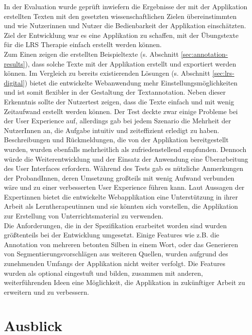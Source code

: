 In der Evaluation wurde geprüft inwiefern die Ergebnisse der mit der Applikation erstellten Texten mit den gesetzten wissenschaftlichen Zielen übereinstimmten und wie Nutzerinnen und Nutzer die Bedienbarkeit der Applikation einschätzten. Ziel der Entwicklung war es eine Applikation zu schaffen, mit der Übungstexte für die LRS Therapie einfach erstellt werden können.\\
Zum Einen zeigen die erstellten Beispieltexte (s. Abschnitt \ref{sec:annotation-results}), dass solche Texte mit der Applikation erstellt und exportiert werden können. Im Vergleich zu bereits existierenden Lösungen (s. Abschnitt \ref{sec:lrs-digital}) bietet die entwickelte Webanwendung mehr Einstellungsmöglichkeiten und ist somit flexibler in der Gestaltung der Textannotation. Neben dieser Erkenntnis sollte der Nutzertest zeigen, dass die Texte einfach und mit wenig Zeitaufwand erstellt werden können. Der Test deckte zwar einige Probleme bei der User Experience auf, allerdings gab bei jedem Szenario die Mehrheit der NutzerInnen an, die Aufgabe intuitiv und zeiteffizient erledigt zu haben. Beschreibungen und Rückmeldungen, die von der Applikation bereitgestellt wurden, wurden ebenfalls mehrheitlich als zufriedenstellend empfunden. Dennoch würde die Weiterentwicklung und der Einsatz der Anwendung eine Überarbeitung des User Interfaces erfordern. Während des Tests gab es nützliche Anmerkungen der ProbandInnen, deren Umsetzung großteils mit wenig Aufwand verbunden wäre und zu einer verbesserten User Experience führen kann. Laut Aussagen der Expertinnen bietet die entwickelte Webapplikation eine Unterstützung in ihrer Arbeit als Lerntherapeutinnen und sie könnten sich vorstellen, die Applikation zur Erstellung von Unterrichtsmaterial zu verwenden.\\
Die Anforderungen, die in der Spezifikation erarbeitet worden sind wurden größtenteils bei der Entwicklung umgesetzt. Einige Features wie z.B. die Annotation von mehreren betonten Silben in einem Wort, oder das Generieren von Segmentierungsvorschlägen aus weiteren Quellen, wurden aufgrund des zunehmenden Umfangs der Applikation nicht weiter verfolgt. Die Features wurden als optional eingestuft und bilden, zusammen mit anderen, weiterführenden Ideen eine Möglichkeit, die Applikation in zukünftiger Arbeit zu erweitern und zu verbessern.

\section{Ausblick}

